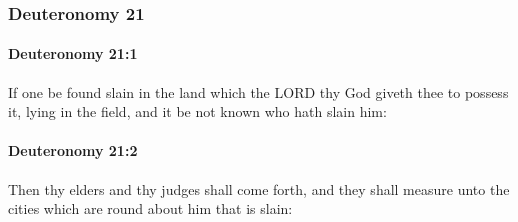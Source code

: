 	\subsubsection{Deuteronomy 21} %
		\label{DEUTERONOMY-21}

		\paragraph{Deuteronomy 21:1} %
			\label{DEUTERONOMY-21-1}

			If one be found slain in the land which the LORD thy God giveth thee to possess it, lying in the field, and it be not known who hath slain him:


		\paragraph{Deuteronomy 21:2} %
			\label{DEUTERONOMY-21-2}

			Then thy elders and thy judges shall come forth, and they shall measure unto the cities which are round about him that is slain:

